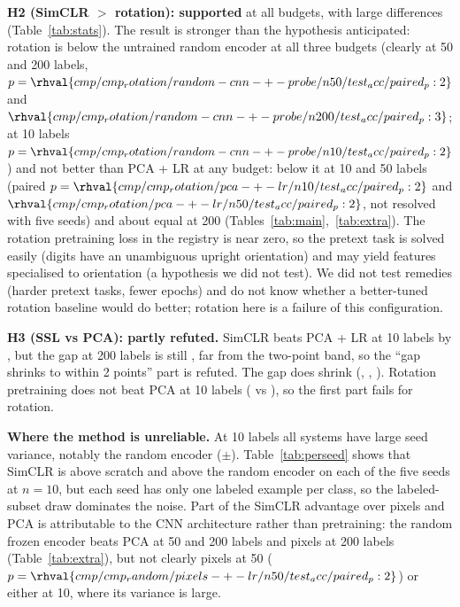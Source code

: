 \textbf{H2 (SimCLR $>$ rotation): supported} at all budgets, with large differences (Table~\ref{tab:stats}). The result is stronger than the hypothesis anticipated: rotation is below the untrained random encoder at all three budgets (clearly at 50 and 200 labels, $p=\rhval{cmp/cmp_rotation/random-cnn-+-probe/n50/test_acc/paired_p:2}$ and $\rhval{cmp/cmp_rotation/random-cnn-+-probe/n200/test_acc/paired_p:3}$; at 10 labels $p=\rhval{cmp/cmp_rotation/random-cnn-+-probe/n10/test_acc/paired_p:2}$) and not better than PCA + LR at any budget: below it at 10 and 50 labels (paired $p=\rhval{cmp/cmp_rotation/pca-+-lr/n10/test_acc/paired_p:2}$ and $\rhval{cmp/cmp_rotation/pca-+-lr/n50/test_acc/paired_p:2}$, not resolved with five seeds) and about equal at 200 (Tables~\ref{tab:main},~\ref{tab:extra}). The rotation pretraining loss in the registry is near zero, so the pretext task is solved easily (digits have an unambiguous upright orientation) and may yield features specialised to orientation (a hypothesis we did not test). We did not test remedies (harder pretext tasks, fewer epochs) and do not know whether a better-tuned rotation baseline would do better; rotation here is a failure of this configuration.

\textbf{H3 (SSL vs PCA): partly refuted.} SimCLR beats PCA + LR at 10 labels by , but the gap at 200 labels is still , far from the two-point band, so the ``gap shrinks to within 2 points'' part is refuted. The gap does shrink (, , ). Rotation pretraining does not beat PCA at 10 labels ( vs ), so the first part fails for rotation.

\begin{table}[t]\centering\caption{Per-seed test accuracy at 10 labels (seed = split, labeled subset and initialisation).}\label{tab:perseed}
\resizebox{0.9\columnwidth}{!}{}\end{table}

\textbf{Where the method is unreliable.} At 10 labels all systems have large seed variance, notably the random encoder ($\pm$). Table~\ref{tab:perseed} shows that SimCLR is above scratch and above the random encoder on each of the five seeds at $n=10$, but each seed has only one labeled example per class, so the labeled-subset draw dominates the noise. Part of the SimCLR advantage over pixels and PCA is attributable to the CNN architecture rather than pretraining: the random frozen encoder beats PCA at 50 and 200 labels and pixels at 200 labels (Table~\ref{tab:extra}), but not clearly pixels at 50 ($p=\rhval{cmp/cmp_random/pixels-+-lr/n50/test_acc/paired_p:2}$) or either at 10, where its variance is large.

